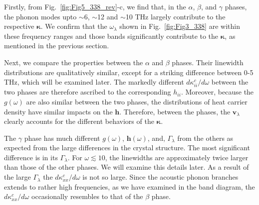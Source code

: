 \documentclass[twocolumn,amsmath,amssymb,a4paper,prb,superscriptaddress,floatfix]{revtex4-1}
\begin{document}
Firstly, from Fig.~\ref{fig:Fig5_338_rev}-c, we find that, in the $\alpha$,
$\beta$, and $\gamma$ phases, the phonon modes upto $\sim$6, $\sim$12 and
$\sim$10 THz largely contribute to the respective $\boldsymbol{\kappa}$. We
confirm that the $\omega_\lambda$ shown in Fig.~\ref{fig:Fig3_338} are within
these frequency ranges and those bands significantly contribute to the
$\boldsymbol{\kappa}$, as mentioned in the previous section.  

Next, we compare the properties between the $\alpha$ and $\beta$ phases.  Their
linewidth distributions are qualitatively similar, except for a striking
difference between 0-5 THz, which will be examined later. The markedly different
$d\kappa_{ii}^c/d\omega$ between the two phases are therefore ascribed to the
corresponding $h_{ii}$. Moreover, because the $g(\omega)$ are also similar
between the two phases, the distributions of heat carrier density have similar
impacts on the $\boldsymbol{h}$.  Therefore, between the phases,
the $\mathbf{v}_\lambda$ clearly accounts for the different behaviors of the
$\boldsymbol{\kappa}$. 

The $\gamma$ phase has much different  $g(\omega)$, $\boldsymbol{h}(\omega)$,
and, $\Gamma_\lambda$ from the others as expected from the large differences in
the crystal structure. The most significant difference is in its
$\Gamma_\lambda$. For $\omega \lesssim 10$, the linewidths are approximately
twice larger than those of the other phases. We will examine this details later.
As a result of the large $\Gamma_\lambda$ the $d\kappa_{xx}^c/d\omega$ is not so
large. Since the acoustic phonon branches extends to rather high frequencies, as
we have examined in the band diagram, the $d\kappa_{xx}^c/d\omega$ occasionally
resembles to that of the $\beta$ phase.
\end{document}
